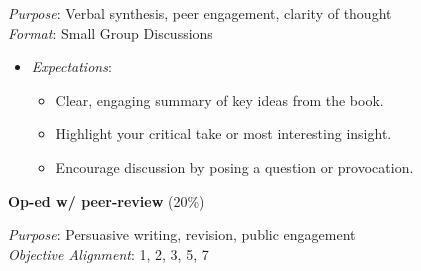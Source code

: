 \documentclass[]{tufte-handout}
\providecommand{\tightlist}{%
  \setlength{\itemsep}{0pt}\setlength{\parskip}{0pt}}
\begin{document}
\emph{Purpose}: Verbal synthesis, peer engagement, clarity of thought\\
\emph{Format}: Small Group Discussions

\begin{itemize}
\tightlist
\item
  \emph{Expectations}:

  \begin{itemize}
  \tightlist
  \item
    Clear, engaging summary of key ideas from the book.
  \item
    Highlight your critical take or most interesting insight.
  \item
    Encourage discussion by posing a question or provocation.
  \end{itemize}
\end{itemize}

\textbf{Op-ed w/ peer-review} (20\%)

\emph{Purpose}: Persuasive writing, revision, public engagement\\
\emph{Objective Alignment}: 1, 2, 3, 5, 7
\end{document}
